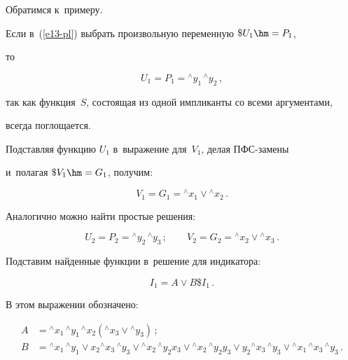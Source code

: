   


   Обратимся к~примеру.


   


   Если в~(\ref{e13-pl}) выбрать произвольную переменную $\$U_1 \hm= P_1$, 


то


   $$


   U_1 = P_1 = {^\wedge y_1}\,{^\wedge y_2}\,,


   $$


так как функция~$S$, состоящая из одной импликанты со всеми аргументами, 


всегда поглощается.





   Подставляя функцию $U_1$ в~выражение для~$V_1$, делая ПФС-за\-ме\-ны 


и~полагая $\$V_1 \hm= G_1$, получим:


   $$


   V_1 = G_1 = {^\wedge x_1} \vee  {^\wedge x_2}\,.


   $$


   


   Аналогично можно найти простые решения:


   \begin{equation*}


   U_2 = P_2 = {^\wedge y_2}\, {^\wedge y_3}\,;\qquad


   V_2 = G_2 = {^\wedge x_2} \vee {^\wedge x_3}\,.


   \end{equation*}


   


   Подставим найденные функции в~решение для индикатора:


   $$


   I_1 = A \vee  B \$I_1\,.


   $$


   В этом выражении обозначено:


   \begin{align*}


   A &= {^\wedge x_1}\, {^\wedge y_1}\, {^\wedge x_2} \left({^\wedge x_3} \vee {^\wedge 


y_3}\right)\,;\\


   B &= {^\wedge x_1}\,{^\wedge y_1} \vee x_2 {^\wedge x_3}\,{^\wedge y_3} \vee 


   {^\wedge x_2}\,{^\wedge y_2} x_3 \vee {^\wedge x_2}\,{^\wedge y_2} y_3 \vee y_2 


   {^\wedge x_3}\,{^\wedge y_3} 


\vee {^\wedge x_1}\,{^\wedge x_3}\,{^\wedge y_3}\,.


   \end{align*}


